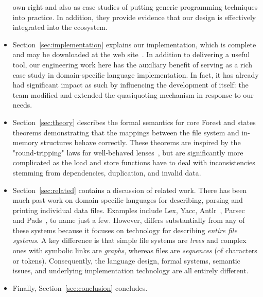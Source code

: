 \begin{itemize}
own right and also as case studies of putting generic programming
techniques into practice.  In addition, they provide evidence that
our design is effectively integrated into the
\haskell{} ecosystem.
\item Section~\ref{sec:implementation} explains our implementation,
which is complete and may be downloaded at the \forest{} web 
site~\cite{forest-web-site}.  In addition to delivering a useful tool,
our engineering work here 
has the auxiliary benefit of serving
as a rich case study in domain-specific language implementation. 
In fact, it has already had significant impact as such by influencing the 
development of \haskell{} itself:  
the \haskell{} team modified and extended  the
quasiquoting mechanism in response to our needs. 

\item Section~\ref{sec:theory} describes the 
formal semantics for core Forest and states
theorems demonstrating that the mappings between the file system and
in-memory structures behave correctly. These theorems are inspired
by the "round-tripping" laws for well-behaved lenses~\cite{lenses}, but are
significantly more complicated as the load and store functions have
to deal with inconsistencies stemming from dependencies,
duplication, and invalid data.
\item Section~\ref{sec:related} contains a discussion of related work.
There has been much past work on domain-specific languages for
describing, parsing and printing individual data files. 
Examples include 
Lex, Yacc,
Antlr~\cite{antlr}, Parsec~\cite{LeijenMeijer:parsec} and 
Pads~\cite{fisher+:toplas}, to name just a few.  
However, \forest{} differs
substantially from any of these systems because it focuses on technology
for describing {\em entire file systems}.  
A key difference is that
simple file systems are {\em trees} and complex ones with symbolic links are 
{\em graphs}, whereas files are {\em sequences} (of characters
or tokens). Consequently,
the language design, formal systems,
semantic issues, and underlying implementation 
technology are all entirely different.  
\item Finally, Section~\ref{sec:conclusion} concludes.
\end{itemize}


